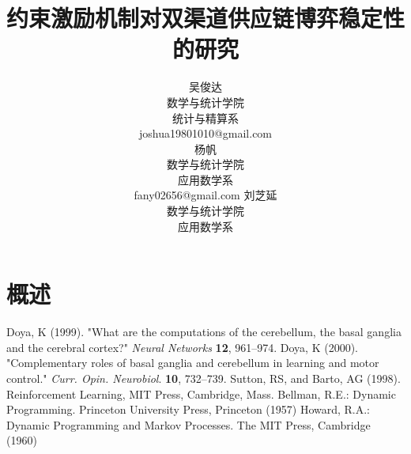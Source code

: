 \documentclass{article}
\title{约束激励机制对双渠道供应链博弈稳定性的研究}
\author{
    吴俊达\\数学与统计学院\\统计与精算系\\joshua19801010@gmail.com\\
    \And
    杨帆\\数学与统计学院\\应用数学系\\fany02656@gmail.com
    \And
    刘芝延\\数学与统计学院\\应用数学系\\
}
\begin{document}
\maketitle
\begin{abstract}
\end{abstract}
\keywords{}
\section{概述}

\begin{thebibliography}{1}
 Doya, K (1999). "What are the computations of the cerebellum, the basal ganglia and the cerebral cortex?" \emph{Neural Networks} \textbf{12}, 961–974.
 Doya, K (2000). "Complementary roles of basal ganglia and cerebellum in learning and motor control." \emph{Curr. Opin. Neurobiol}. \textbf{10}, 732–739.
 Sutton, RS, and Barto, AG (1998). Reinforcement Learning, MIT Press, Cambridge, Mass.
 Bellman, R.E.: Dynamic Programming. Princeton University Press, Princeton (1957)
 Howard, R.A.: Dynamic Programming and Markov Processes. The MIT Press, Cambridge (1960)
\end{thebibliography}
\end{document}
